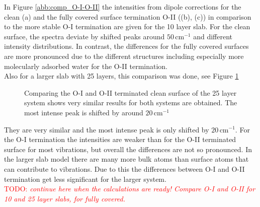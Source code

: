 \documentclass[11pt,DIV=13,BCOR=5mm,a4paper,headinclude]{scrbook}
\newcommand\todo[1]{\textcolor{red}{TODO: \textit{{#1}}}}
\begin{document}
In Figure \ref{abb:comp_O-I-O-II} the intensities from dipole corrections for the clean (a) and the fully covered surface termination O-II ((b), (c)) in comparison to the more stable O-I termination are given for the 10 layer slab.
For the clean surface, the spectra deviate by shifted peaks around $50\,$cm$^{-1}$ and different intensity distributions.
In contrast, the differences for the fully covered surfaces are more pronounced due to the different structures including especially more molecularly adsorbed water for the O-II termination.
\\
Also for a larger slab with 25 layers, this comparison was done, see Figure \ref{abb:comp_O-I-O-II_25}
 \begin{figure}[!h]
 \centering
 \caption{Comparing the O-I and O-II terminated clean surface of the 25 layer system shows very similar results for both systems are obtained.
The most intense peak is shifted by around $20\,$cm$^{-1}$}%
 \label{abb:comp_O-I-O-II_25}
\end{figure}
They are very similar and the most intense peak is only shifted by $20\,$cm$^{-1}$.
For the O-I termination the intensities are weaker than for the O-II terminated surface for most vibrations, but overall the differences are not so pronounced.
In the larger slab model there are many more bulk atoms than surface atoms that can contribute to vibrations.
Due to this the differences between O-I and O-II termination get less significant for the larger system.
\\ \todo{continue here when the calculations are ready! Compare O-I and O-II for 10 and 25 layer slabs, for fully covered.}
\end{document}
